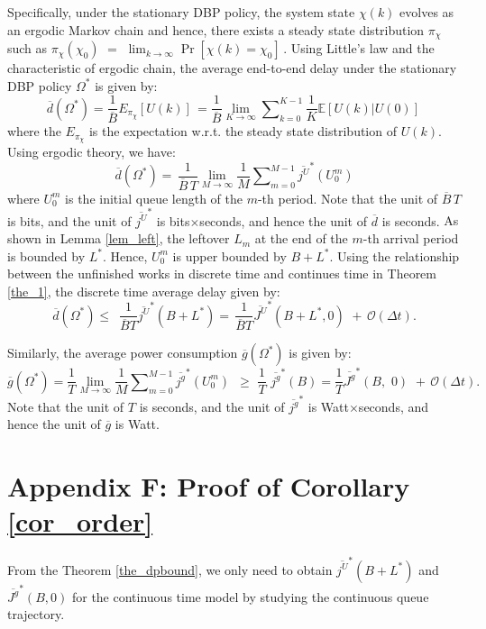 \documentclass[11pt,journal, onecolumn]{./IEEEtran}
\newcommand{\red}{\color{black}}
\begin{document}
Specifically, under the stationary DBP policy, the system state $\chi(k)$ evolves as an ergodic Markov chain and hence, there exists a steady state distribution $\pi_{\chi}$ such as ${\pi _\chi }\left( {{\chi _0}} \right)\,\, = \,\,{\lim _{k \to \infty }}\Pr \left[ {\chi (k) = {\chi _0}} \right]\,$. Using Little's law and the characteristic of ergodic chain, the average end-to-end delay under the stationary DBP policy $\Omega^*$ is given by:
\[\overline d \left( {{\Omega ^*}} \right) = \frac{1}{{\overline B }}{E_{{\pi _\chi }}}\left[ {U(k)} \right]\, = \frac{1}{{\overline B }}\mathop {\lim }\limits_{K \to \infty } \sum\nolimits_{k = 0}^{K - 1} {\frac{1}{K}\mathbb E\left[ {U(k)\left| {U(0)} \right.} \right]} \,\]
where the ${E_{{\pi _\chi }}}$ is the expectation w.r.t. the steady state distribution of $U(k)$. Using ergodic theory, we have:
\[\overline d \left( {{\Omega ^*}} \right) = \,\frac{1}{{\overline B \,T}}\mathop {\lim }\limits_{M \to \infty } \frac{1}{M}\sum\nolimits_{m = 0}^{M - 1} {{{\overline {{j^U}} }^*}(U_0^m)} \]
where $U_0^m$ is the initial queue length of the $m$-th period. {\red Note that the unit of $\overline B \,T$ is bits, and the unit of ${{\overline {{j^U}} }^*}$ is bits$\times$seconds, and hence the unit of $\overline d $ is seconds.} As shown in Lemma \ref{lem_left}, the leftover $L_m$ at the end of the $m$-th arrival period is bounded by $L^*$. Hence, $U_0^m$ is upper bounded by $B+L^*$. Using the relationship between the unfinished works in discrete time and continues time in Theorem \ref{the_1}, the discrete time average delay given by:
\[\overline d \left( {{\Omega ^*}} \right) \le \,\,\,\frac{1}{{\overline B T}}{\overline {{j^U}} ^*}(B + {L^*}) = \,\frac{1}{{\overline B T}}{\overline {{J^U}} ^*}(B + {L^*},0)\,\, + \,\mathcal O\left( {{\Delta t}} \right).\]

Similarly, the average power consumption $\overline g ({\Omega ^*})$ is given by:
\[\overline g \left( {{\Omega ^*}} \right) = \frac{1}{T}\mathop {\lim }\limits_{M \to \infty } \frac{1}{M}\sum\nolimits_{m = 0}^{M - 1} {{{\overline {{j^g}} }^*}(U_0^m)} \,\,\, \ge \,\,\frac{1}{T}\,\,{\overline {{j^g}} ^*}(B) = \frac{1}{T}{\overline {{J^g}} ^*}(B,\,\,0)\,\, + \,\mathcal O\left( {{\Delta t}} \right).\]
{\red Note that the unit of $T$ is seconds, and the unit of ${{\overline {{j^g}} }^*}$ is Watt$\times$seconds, and hence the unit of $\overline g $ is Watt.}


\section*{Appendix F: Proof of Corollary \ref{cor_order}}\label{app_order}
{\red From the Theorem \ref{the_dpbound}, we only need to obtain ${\overline {{j^U}} ^*}(B + {L^*})$ and ${\overline {{J^g}} ^*}(B,0)$ for the continuous time model by studying the continuous queue trajectory.}
\end{document}
